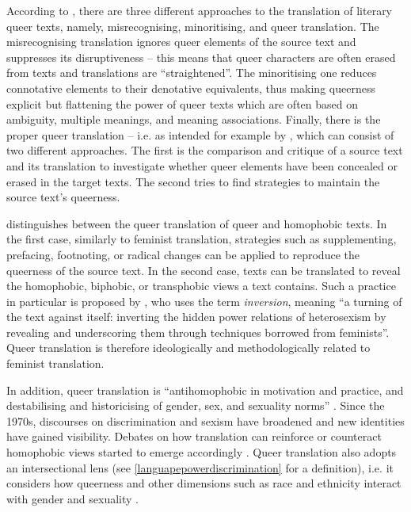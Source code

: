 According to \textcite{demont2017three}, there are three different approaches to the translation of literary queer texts, namely, misrecognising, minoritising, and queer translation. The misrecognising translation ignores queer elements of the source text and suppresses its disruptiveness -- this means that queer characters are often erased from texts and translations are ``straightened''. The minoritising one reduces connotative elements to their denotative equivalents, thus making queerness explicit but flattening the power of queer texts which are often based on ambiguity, multiple meanings, and meaning associations. Finally, there is the proper queer translation -- i.e. as intended for example by \textcite{burton2010inverting}, which can consist of two different approaches. The first is the comparison and critique of a source text and its translation to investigate whether queer elements have been concealed or erased in the target texts. The second tries to find strategies to maintain the source text's queerness. 

\textcite{epstein2017eradicalization} distinguishes between the queer translation of queer and homophobic texts. In the first case, similarly to feminist translation, strategies such as supplementing, prefacing, footnoting, or radical changes can be applied to reproduce the queerness of the source text. In the second case, texts can be translated to reveal the homophobic, biphobic, or transphobic views a text contains. Such a practice in particular is proposed by \textcite[57]{burton2010inverting}, who uses the term \textit{inversion}, meaning ``a turning of the text against itself: inverting the hidden power relations of heterosexism by revealing and underscoring them through techniques borrowed from feminists''. Queer translation is therefore ideologically and methodologically related to feminist translation. 

In addition, queer translation is ``antihomophobic in motivation and practice, and destabilising and historicising of gender, sex, and sexuality norms'' \citep[55]{burton2010inverting}. Since the 1970s, discourses on discrimination and sexism have broadened and new identities have gained visibility. Debates on how translation can reinforce or counteract homophobic views started to emerge accordingly \citep[54]{burton2010inverting}. Queer translation also adopts an intersectional lens (see \ref{languapepowerdiscrimination} for a definition), i.e. it considers how queerness and other dimensions such as race and ethnicity interact with gender and sexuality \citep[55]{burton2010inverting}.


